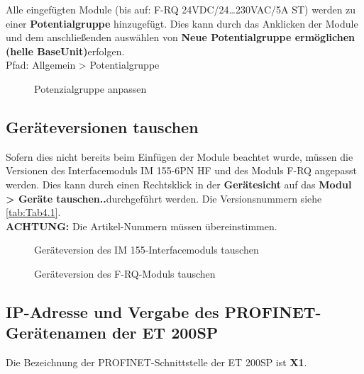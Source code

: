 Alle eingefügten Module (bis auf: F-RQ 24VDC/24…230VAC/5A ST) werden zu einer \textbf{Potentialgruppe} hinzugefügt. Dies kann durch das Anklicken der Module und dem anschließenden auswählen von \glqq\textbf{Neue Potentialgruppe ermöglichen (helle BaseUnit)}\grqq\:erfolgen.\\
Pfad: Allgemein > Potentialgruppe

\begin{figure}[H]
   \centering
   \caption[Potenzialgruppe anpassen]{Potenzialgruppe anpassen}
   \label{fig:Bild4.5}
\end{figure}

\subsection{Geräteversionen tauschen}
Sofern dies nicht bereits beim Einfügen der Module beachtet wurde, müssen die Versionen des Interfacemoduls IM 155-6PN HF und des Moduls F-RQ angepasst werden. Dies kann durch einen Rechtsklick in der \textbf{Gerätesicht} auf das \glqq\textbf{Modul > Geräte tauschen..}\grqq\:durchgeführt werden. Die Versionsnummern siehe \autoref{tab:Tab4.1}. \\
\textbf{ACHTUNG:} Die Artikel-Nummern müssen übereinstimmen.

\begin{figure}[H]
   \centering
   \caption[Geräteversion des IM 155-Interfacemoduls tauschen]{Geräteversion des IM 155-Interfacemoduls tauschen}
   \label{fig:Bild4.6}
\end{figure}

\begin{figure}[H]
   \centering
   \caption[Geräteversion des F-RQ-Moduls tauschen]{Geräteversion des F-RQ-Moduls tauschen}
   \label{fig:Bild4.7}
\end{figure}

\subsection{IP-Adresse und Vergabe des PROFINET-Gerätenamen der ET 200SP} \label{sec: IP-Adresse_PROFINET-Gerätename_ET_200SP}
Die Bezeichnung der PROFINET-Schnittstelle der ET 200SP ist \textbf{X1}.

